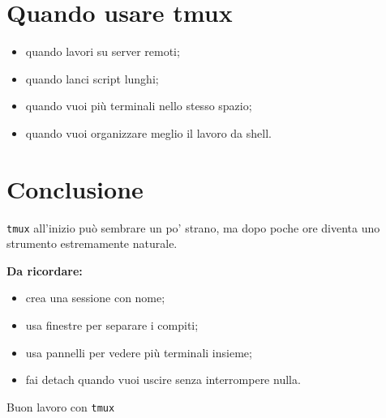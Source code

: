 \documentclass[a4paper,11pt]{article}
\begin{document}
\section{Quando usare tmux}
\begin{itemize}[leftmargin=1.2cm]
    \item quando lavori su server remoti;
    \item quando lanci script lunghi;
    \item quando vuoi più terminali nello stesso spazio;
    \item quando vuoi organizzare meglio il lavoro da shell.
\end{itemize}

\section{Conclusione}
\texttt{tmux} all'inizio può sembrare un po' strano, ma dopo poche ore diventa uno strumento estremamente naturale.

\begin{tipbox}
\textbf{Da ricordare:}
\begin{itemize}[leftmargin=1.2cm]
    \item crea una sessione con nome;
    \item usa finestre per separare i compiti;
    \item usa pannelli per vedere più terminali insieme;
    \item fai detach quando vuoi uscire senza interrompere nulla.
\end{itemize}
\end{tipbox}

\vfill
\begin{center}
\textcolor{AccentColor}{\large Buon lavoro con \texttt{tmux}}
\end{center}
\end{document}
